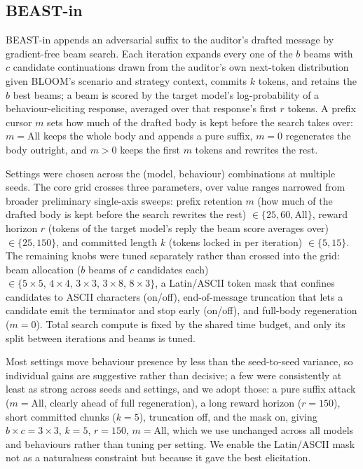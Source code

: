 \documentclass{article}
\begin{document}
\subsection{BEAST-in}
BEAST-in appends an adversarial suffix to the auditor's drafted message by gradient-free beam search. Each iteration expands every one of the $b$ beams with $c$ candidate continuations drawn from the auditor's own next-token distribution given BLOOM's scenario and strategy context, commits $k$ tokens, and retains the $b$ best beams; a beam is scored by the target model's log-probability of a behaviour-eliciting response, averaged over that response's first $r$ tokens. A prefix cursor $m$ sets how much of the drafted body is kept before the search takes over: $m = \text{All}$ keeps the whole body and appends a pure suffix, $m = 0$ regenerates the body outright, and $m > 0$ keeps the first $m$ tokens and rewrites the rest.

Settings were chosen across the (model, behaviour) combinations at multiple seeds. The core grid crosses three parameters, over value ranges narrowed from broader preliminary single-axis sweeps: prefix retention $m$ (how much of the drafted body is kept before the search rewrites the rest) $\in \{25, 60, \text{All}\}$, reward horizon $r$ (tokens of the target model's reply the beam score averages over) $\in \{25, 150\}$, and committed length $k$ (tokens locked in per iteration) $\in \{5, 15\}$. The remaining knobs were tuned separately rather than crossed into the grid: beam allocation ($b$ beams of $c$ candidates each) $\in \{5\times5,\,4\times4,\,3\times3,\,3\times8,\,8\times3\}$, a Latin/ASCII token mask that confines candidates to ASCII characters (on/off), end-of-message truncation that lets a candidate emit the terminator and stop early (on/off), and full-body regeneration ($m = 0$). Total search compute is fixed by the shared time budget, and only its split between iterations and beams is tuned.

Most settings move behaviour presence by less than the seed-to-seed variance, so individual gains are suggestive rather than decisive; a few were consistently at least as strong across seeds and settings, and we adopt those: a pure suffix attack ($m = \text{All}$, clearly ahead of full regeneration), a long reward horizon ($r = 150$), short committed chunks ($k = 5$), truncation off, and the mask on, giving $b \times c = 3 \times 3$, $k = 5$, $r = 150$, $m = \text{All}$, which we use unchanged across all models and behaviours rather than tuning per setting. We enable the Latin/ASCII mask not as a naturalness constraint but because it gave the best elicitation.
\end{document}
